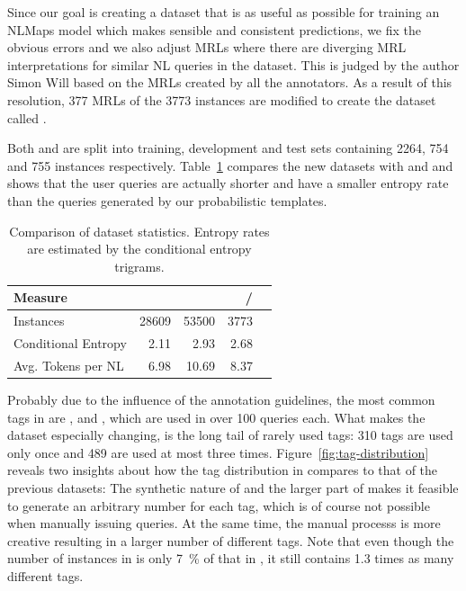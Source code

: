 Since our goal is creating a dataset that is as useful as possible for training
an NLMaps model which makes sensible and consistent predictions, we fix the
obvious errors and we also adjust MRLs where there are diverging MRL
interpretations for similar NL queries in the dataset. This is judged by the
author Simon Will based on the MRLs created by all the annotators. As a result
of this resolution, \num{377} MRLs of the \num{3773} instances are modified to
create the dataset called \nlmapsfour{}.

Both \nlmfourraw{} and \nlmfour{} are split into training, development and test
sets containing \num{2264}, \num{754} and \num{755} instances respectively.
Table~\ref{tab:v2-v3-v4-overview} compares the new datasets with \nlmtwoone{}
and \nlmthreeb{} and shows that the user queries are actually shorter and have a
smaller entropy rate than the queries generated by our probabilistic templates.

\begin{table}[h]
  \centering
  \begin{tabular}{lrrrr}
    \toprule
    Measure & \nlmtwoone{} & \nlmthreeb{} & \nlmfourraw{}/\nlmfour{}\\
    \midrule
    Instances & \num{28609} & \num{53500} & \num{3773}\\
    Conditional Entropy & \num{2.11} & \num{2.93} & \num{2.68}\\
    Avg. Tokens per NL & \num{6.98} & \num{10.69} & \num{8.37}\\
    \bottomrule
  \end{tabular}
  \caption[Dataset statistics]{Comparison of dataset statistics. Entropy rates
    are estimated by the conditional entropy trigrams.}
  \label{tab:v2-v3-v4-overview}
\end{table}

Probably due to the influence of the annotation guidelines, the most common tags
in \nlmapsfour{} are ,  and
, which are used in over \num{100} queries each. What makes
the dataset especially changing, is the long tail of rarely used tags: \num{310}
tags are used only once and \num{489} are used at most three times.
Figure~\ref{fig:tag-distribution} reveals two insights about how the tag
distribution in \nlmapsfour{} compares to that of the previous datasets: The
synthetic nature of \nlmapsthreeb{} and the larger part of \nlmapstwoone{} makes
it feasible to generate an arbitrary number for each tag, which is of course not
possible when manually issuing queries. At the same time, the manual processs is
more creative resulting in a larger number of different tags. Note that even
though the number of instances in \nlmapsfour{} is only \SI{7}{\%} of that in
\nlmapsthree{}, it still contains \num{1.3} times as many different tags.

